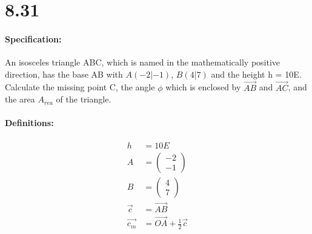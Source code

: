 \section{8.31}
\paragraph{Specification:}
An isosceles triangle ABC, which is named in the mathematically positive direction, has the 
base AB with $A(-2|-1)$, $B(4|7)$ and the height h = 10E. Calculate the missing point C, the angle
$\phi$ which is enclosed by $\vec{AB}$ and $\vec{AC}$, and the area $A_{rea}$ of the triangle.

\def\height{10}

\def\A{\begin{pmatrix}
    -2 \\ 
    -1
\end{pmatrix}}

\def\B{\begin{pmatrix}
    4 \\ 
    7
\end{pmatrix}}

\def\AB{\begin{pmatrix}
    6 \\ 
    8
\end{pmatrix}}

\def\ABhalf{\begin{pmatrix}
    3 \\ 
    4
\end{pmatrix}}

\def\ABmid{\begin{pmatrix}
    1 \\ 
    3
\end{pmatrix}}

\def\ABnorm{\begin{pmatrix}
    -8 \\ 
    6
\end{pmatrix}}

\def\ABnrommag{\sqrt{(-8)^2 + 6^2}}

\def\ABmidzero{\begin{pmatrix}
    -0.8 \\ 
    0.6
\end{pmatrix}}

\paragraph{Definitions:}
\begin{align}
    h &= \height E \\
    A &= \A \\
    B &= \B \\
    \vec{c} &= \vec{AB} \\
    \vec{c_m} &= \vec{OA} + \frac{1}{2} \vec{c}
\end{align}

